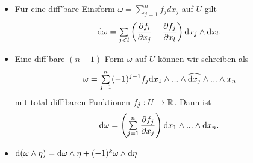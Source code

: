 \documentclass{cheat-sheet}
\let\myBinom\binom
\renewcommand{\binom}[2]{\mathsmaller{\myBinom{#1}{#2}}}
\begin{document}
\iffalse
\begin{bsp}
  Für $k = 1$: $\omega = \sum_{j = 1}^n f_j \d x_j$
  $\d \omega = \sum_{j=1}^n \d f_j \wedge \d x_j = \sum_{j=1}^n (\sum_{k=1}^n \frac{\partial f_j}{\partial x_k} \d x_k) \wedge \d x_j = \sum_{j=1}^k (\frac{\partial f_j}{\partial x_k} - \frac{\partial f_k}{\partial x_j}) \d x_k \wedge \d x_j$.

  $k = n -1$: $\mathrm{dim}(\Lambda^{n-1} V^*) = \binom{n}{n-1} = n = \mathrm{dim}(V)$
  $\Set{ (-1)^{j-1} \d x_1(u) \wedge ... \wedge \widehat{\d x_j(u)} \wedge ... \wedge \d x_n(u) }{ 1 \leq j \leq n }$ ist für alle $u \in U$ eine Basis von $\Lambda^{n-1} T_u^* U$.

  $\omega = \sum_{j=1}^n (-1)^{j-1} f_j \d x_1 \wedge ... \wedge \widehat{\d x_j} \wedge ... \wedge \d x_n$
  $\d \omega = \sum_{j=1}^n (-1)^{j-1} \d f_j \wedge \d x_1 \wedge ... \wedge \widehat{\d x_j} \wedge ... \wedge \d x_n = \begin{cases} 0, & \text{falls} j \not= k \\ \d x_1 \wedge ... \wedge \d x_n & j = k \end{cases}$
\end{bsp}
\fi

\begin{bem}
  \begin{itemize}
    \item Für eine diff'bare Einsform $\omega = \sum_{j=1}^n f_j dx_j$ auf $U$ gilt
    \[ \d \omega = \sum_{j<l} \left( \frac{\partial f_l}{\partial x_j} - \frac{\partial f_j}{\partial x_l} \right) \d x_j \wedge \d x_l. \]
    \item Eine diff'bare $(n{-}1)$-Form $\omega$ auf $U$ können wir schreiben als
    \[ \omega = \sum_{j=1}^n (-1)^{j-1} f_j \d x_1 \wedge ... \wedge \widehat{\d x_j} \wedge ... \wedge x_n \]
    mit total diff'baren Funktionen $f_j : U \to \mathbb{R}$. Dann ist
    \[ \d \omega = \left( \sum_{j=1}^n \frac{\partial f_j}{\partial x_j} \right) \d x_1 \wedge ... \wedge \d x_n. \]
  \end{itemize}
\end{bem}

\begin{satz}%
  \begin{itemize}
    \item $\mathrm{d} (\omega \wedge \eta) = \mathrm{d} \omega \wedge \eta + (-1)^k \omega \wedge \mathrm{d} \eta$
  \end{itemize}
\end{satz}
\end{document}
